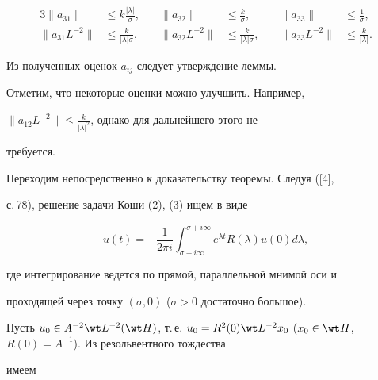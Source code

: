 \begin{pf}
\begin{alignat*}{3} 


\|a_{31}\|&\le k\frac{|\lambda|}{\sigma}, &\quad 


\|a_{32}\|&\le \frac{k}{\sigma}, &\quad 


\|a_{33}\|&\le \frac{1}{\sigma}, \\ 


% 


\|a_{31}L^{-2}\| &\le \frac{k}{|\lambda|\sigma}, &\quad 


\|a_{32}L^{-2}\|&\le \frac{k}{|\lambda|\sigma}, &\quad 


\|a_{33}L^{-2}\|&\le \frac{k}{|\lambda|}. 


\end{alignat*} 


Из полученных оценок $a_{ij}$ следует утверждение леммы. 


\end{pf} 


 


 


Отметим, что некоторые оценки можно улучшить. Например, 


$\|a_{12}L^{-2}\|\le\frac{k}{|\lambda|^2}$, однако для дальнейшего этого не 


требуется. 


 


Переходим непосредственно к доказательству теоремы. Следуя ([4], 


с.\,78), решение задачи Коши (2), (3) ищем в виде 


$$ 


u(t)= 


-\frac{1}{2\pi i}\int^{\sigma+i\infty}_{\sigma-i\infty}e^{\lambda t} 


R(\lambda)u(0)d\lambda, 


$$ 


где интегрирование ведется по прямой, параллельной мнимой оси и 


проходящей через точку $(\sigma,0)$ ($\sigma>0$ достаточно большое). 


 


Пусть $u_0\in A^{-2}\wt L{}^{-2}(\wt H)$, т.\,е. $u_0=R^2(0)\wt 


L{}^{-2}x_0$ ($x_0\in \wt H$, $R(0)=A^{-1}$). Из резольвентного тождества 


имеем 


